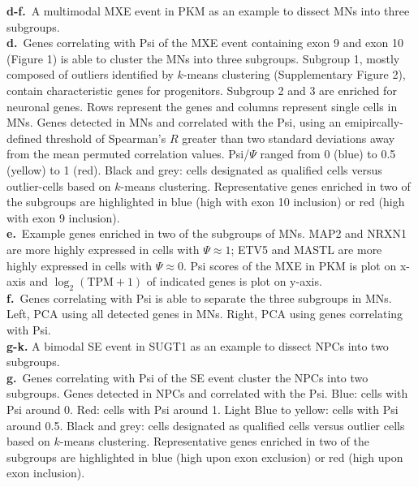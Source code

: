 \begin{minipage}{\textwidth}
{%
\textbf{d-f.}~A multimodal MXE event in PKM as an example to dissect MNs into three subgroups.\\
\textbf{d.}~Genes correlating with Psi of the MXE event containing exon 9 and exon 10 (Figure 1) is able to cluster the MNs into three subgroups. Subgroup 1, mostly composed of outliers identified by $k$-means clustering (Supplementary Figure 2), contain characteristic genes for progenitors. Subgroup 2 and 3 are enriched for neuronal genes. Rows represent the genes and columns represent single cells in MNs. Genes detected in MNs and correlated with the Psi, using an emipircally-defined threshold of Spearman's $R$ greater than two standard deviations away from the mean permuted correlation values. Psi/$\Psi$ ranged from 0 (blue) to 0.5 (yellow) to 1 (red). Black and grey: cells designated as qualified cells versus outlier-cells based on $k$-means clustering. Representative genes enriched in two of the subgroups are highlighted in blue (high with exon 10 inclusion) or red (high with exon 9 inclusion). \\
\textbf{e.}~Example genes enriched in two of the subgroups of MNs. MAP2 and NRXN1 are more highly expressed in cells with $\Psi \approx 1$; ETV5 and MASTL are more highly expressed in cells with $\Psi \approx 0$. Psi scores of the MXE in PKM is plot on x-axis and $\log_2(\mathrm{TPM}+1)$ of indicated genes is plot on y-axis.\\
\textbf{f.}~Genes correlating with Psi is able to separate the three subgroups in MNs. Left, PCA using all detected genes in MNs. Right, PCA using genes correlating with Psi.\\
\textbf{g-k.} A bimodal SE event in SUGT1 as an example to dissect NPCs into two subgroups.\\
\textbf{g.}~Genes correlating with Psi of the SE event cluster the NPCs into two subgroups. Genes detected in NPCs and correlated with the Psi. Blue: cells with Psi around 0. Red: cells with Psi around 1. Light Blue to yellow: cells with Psi around 0.5. Black and grey: cells designated as qualified cells versus outlier cells based on $k$-means clustering. Representative genes enriched in two of the subgroups are highlighted in blue (high upon exon exclusion) or red (high upon exon inclusion). \\
}
\end{minipage}
